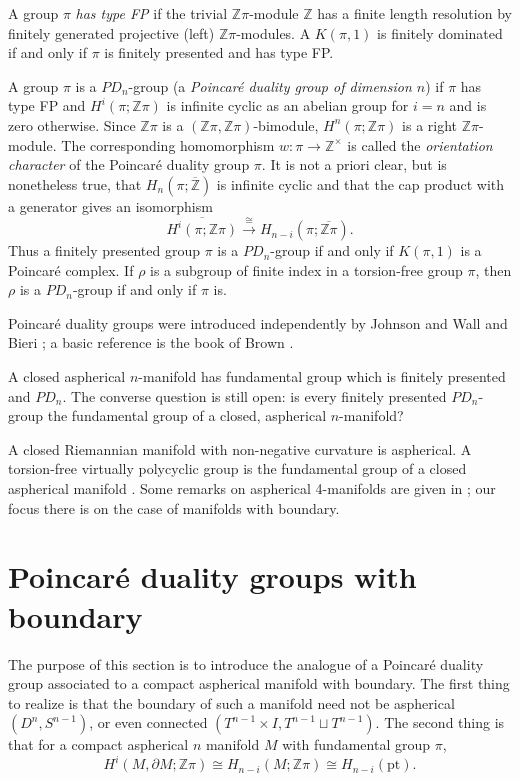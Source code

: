\documentclass[12pt]{amsart}
\theoremstyle{definition}
\newcommand{\Z}{\mathbb Z}
\newcommand{\ol}[1]{{\overline{#1}}}
\newcommand{\zp}{\Z\pi}
\begin{document}
A group $\pi$ {\em has type FP} if the trivial $\Z\pi$-module $\Z$ has a finite length resolution 
by finitely generated projective (left) $\Z\pi$-modules.  A $K(\pi,1)$ is finitely dominated if and only if $\pi$ is finitely presented and has type FP.

A group $\pi$ is a $PD_n$-group (a {\em Poincar\'e duality group
of dimension $n$}) if $\pi$ has type FP and $H^i(\pi; \Z\pi)$ is infinite cyclic as an abelian group for $i = n$ and is zero otherwise.
Since $\Z\pi$ is a $(\Z\pi,\Z\pi)$-bimodule, 
$H^n(\pi; \Z\pi)$ is a right $\Z\pi$-module.   
The corresponding homomorphism $w: \pi \to \Z^\times$ is called
the {\em orientation character} of the Poincar\'e duality group $\pi$.
It is not a priori clear, but is nonetheless true, that $H_n(\pi; \ol \Z)$ is infinite cyclic and that the cap product with a generator gives an isomorphism
$$
\ol{H^i(\pi ; \zp)} \xrightarrow{\cong} H_{n-i}(\pi ; \ol\zp).
$$
Thus a finitely presented group $\pi$ is a $PD_n$-group if and only if  $K(\pi,1)$ is a Poincar\'e complex.   If $\rho$ is a subgroup of finite index in a torsion-free group $\pi$, then $\rho$ is a $PD_n$-group if and only if $\pi$ is.  


Poincar\'e duality groups were introduced independently by Johnson and Wall \cite{JW} and Bieri \cite{Bieri}; 
a basic reference is the book of Brown \cite{Brown}.

  A closed aspherical $n$-manifold has fundamental group which is finitely presented and $PD_n$. The converse question  is still open:   is every finitely presented $PD_n$-group the fundamental group of a closed, aspherical $n$-manifold?

A closed Riemannian manifold with non-negative curvature is aspherical.   A torsion-free virtually polycyclic group is the fundamental group of a closed aspherical manifold \cite{AJ}.  Some remarks on aspherical 4-manifolds are given in \cite{DH2}; our focus there is on the case of manifolds with boundary.

\section{Poincar\'e duality groups with boundary}   \label{pdgb_section}


The purpose of this section is to introduce the analogue of a Poincar\'e duality group associated to a compact aspherical manifold with boundary.    The first thing to realize is that the boundary of such a manifold need not be aspherical  $(D^n,S^{n-1})$, or even connected $(T^{n-1} \times I, T^{n-1} \sqcup T^{n-1})$.   The second thing is that for a compact aspherical $n$ manifold $M$ with fundamental group $\pi$,
$$
H^i(M,\partial M; \Z\pi) \cong H_{n-i}(M; \Z\pi) \cong H_{n-i}(\text{pt}).
$$
\end{document}
